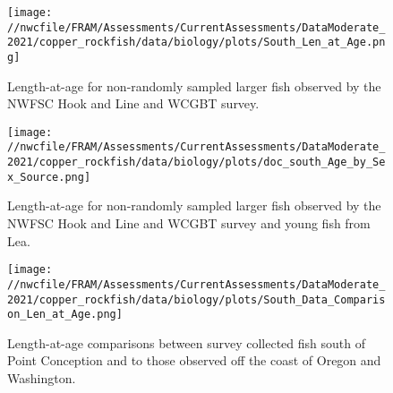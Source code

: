 \documentclass[11pt,
  english,
  a4paper,
]{article}
\begin{document}
\tagmcend\tagstructend


\begin{figure}
\centering
\texttt{[image: //nwcfile/FRAM/Assessments/CurrentAssessments/DataModerate\_2021/copper\_rockfish/data/biology/plots/South\_Len\_at\_Age.png]}
\caption{Length-at-age for non-randomly sampled larger fish observed by the NWFSC Hook and Line and WCGBT survey.\label{fig:survey-len-at-age-data}}
\end{figure}

\tagmcend\tagstructend


\begin{figure}
\centering
\texttt{[image: //nwcfile/FRAM/Assessments/CurrentAssessments/DataModerate\_2021/copper\_rockfish/data/biology/plots/doc\_south\_Age\_by\_Sex\_Source.png]}
\caption{Length-at-age for non-randomly sampled larger fish observed by the NWFSC Hook and Line and WCGBT survey and young fish from Lea.\label{fig:south-len-at-age-data}}
\end{figure}

\tagmcend\tagstructend


\begin{figure}
\centering
\texttt{[image: //nwcfile/FRAM/Assessments/CurrentAssessments/DataModerate\_2021/copper\_rockfish/data/biology/plots/South\_Data\_Comparison\_Len\_at\_Age.png]}
\caption{Length-at-age comparisons between survey collected fish south of Point Conception and to those observed off the coast of Oregon and Washington.\label{fig:len-at-age-comp}}
\end{figure}

\tagmcend\tagstructend

\clearpage

\end{document}
